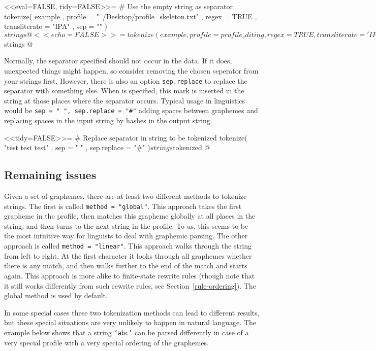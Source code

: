 <<eval=FALSE, tidy=FALSE>>=
# Use the empty string as separator
tokenize( example
         , profile = "~/Desktop/profile_skeleton.txt"
         , regex = TRUE
         , transliterate = "IPA"
         , sep = ""
        )$strings
@

<<echo=FALSE>>=
tokenize(example
  , profile = profile_editing
  , regex = TRUE
  , transliterate = 'IPA'
  , sep = ''
  )$strings
@

Normally, the separator specified should not occur in the data. If it does,
unexpected things might happen, so consider removing the chosen seperator from
your strings first. However, there is also an option \texttt{sep.replace} to
replace the separator with something else. When  is specified,
this mark is inserted in the string at those places where the separator occurs.
Typical usage in linguistics would be \texttt{sep = " ", sep.replace = "\#"} adding
spaces between graphemes and replacing spaces in the input string by hashes in
the output string.

<<tidy=FALSE>>=
# Replace separator in string to be tokenized
tokenize( "test test test"
         , sep = " "
         , sep.replace = "#"
        )$strings$tokenized
@

\subsection*{Remaining issues}

Given a set of graphemes, there are at least two different methods to tokenize
strings. The first is called \texttt{method = "global"}. This approach
takes the first grapheme in the profile, then matches this grapheme globally at
all places in the string, and then turns to the next string in the profile. To
us, this seems to be the most intuitive way for linguists to deal with graphemic
parsing. The other approach is called \texttt{method = "linear"}. This
approach walks through the string from left to right. At the first character it
looks through all graphemes whether there is any match, and then walks further
to the end of the match and starts again. This approach is more alike to
finite-state rewrite rules (though note that it still works differently from
such rewrite rules, see Section~\ref{rule-ordering}). The global method is used 
by default.

In some special cases these two tokenization methods can lead to different
results, but these special situations are very unlikely to happen in natural
language. The example below shows that a string \texttt{'abc'} can be parsed
differently in case of a very special profile with a very special ordering of
the graphemes.

